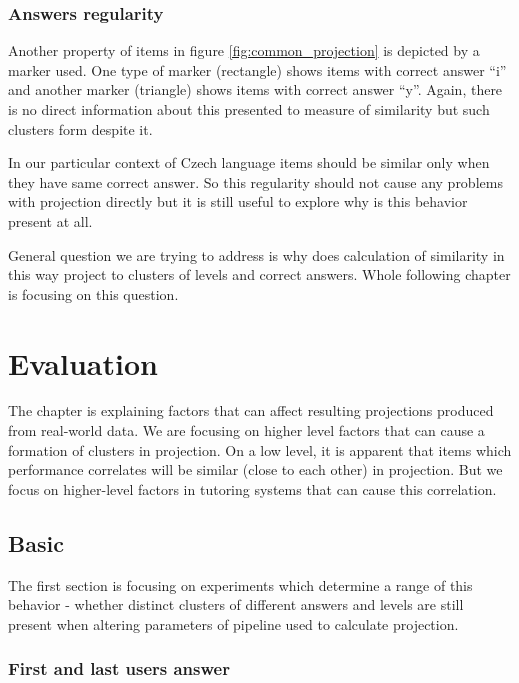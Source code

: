 \documentclass[
  digital, %
  table,   %
  nolof,     %
  nolot,     %
  nocover,
  color
]{fithesis3}
\begin{document}
\subsection{Answers regularity}\label{answers-regularity}

Another property of items in figure \ref{fig:common_projection} is depicted by a marker used. One type of marker (rectangle) shows items with correct answer ``i'' and another marker (triangle) shows items with correct answer ``y''. Again, there is no direct information about this presented to measure of similarity but such clusters form despite it.

In our particular context of Czech language items should be similar only when they have same correct answer. So this regularity should not cause any problems with projection directly but it is still useful to explore why is this behavior present at all.


General question we are trying to address is why does calculation of similarity in this way project to clusters of levels and correct answers. Whole following chapter is focusing on this question.


\chapter{Evaluation}\label{evaluation}

The chapter is explaining factors that can affect resulting projections produced from real-world data. We are focusing on higher level factors that can cause a formation of clusters in projection. On a low level, it is apparent that items which performance correlates will be similar (close to each other) in projection. But we focus on higher-level factors in tutoring systems that can cause this correlation.

\section{Basic}\label{evaluation-basic}

The first section is focusing on experiments which determine a range of this behavior - whether distinct clusters of different answers and levels are still present when altering parameters of pipeline used to calculate projection.

\subsection{First and last users answer}\label{first-and-last-users-answer}
\end{document}
